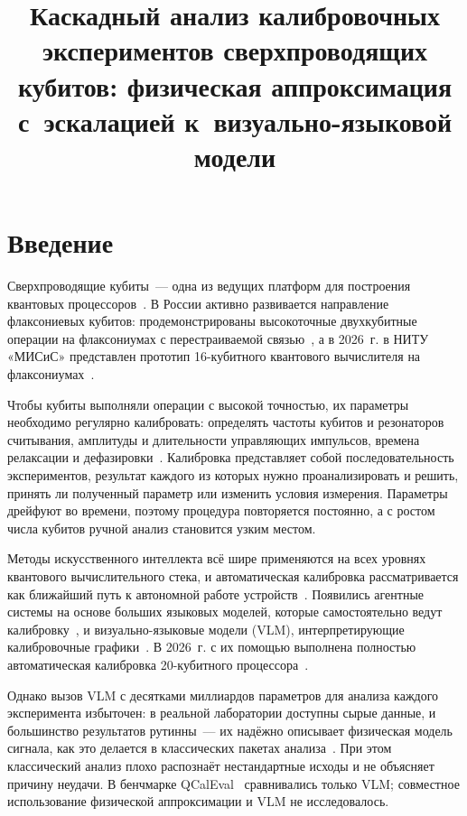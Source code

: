 \documentclass{misisarticle}
\title{Каскадный анализ калибровочных экспериментов сверхпроводящих кубитов: физическая аппроксимация с~эскалацией к~визуально-языковой модели}
\begin{document}
\maketitle

\section{Введение}

Сверхпроводящие кубиты~--- одна из ведущих платформ для построения квантовых процессоров~\cite{krantz2019}. В России активно развивается направление флаксониевых кубитов: продемонстрированы высокоточные двухкубитные операции на флаксониумах с перестраиваемой связью~\cite{moskalenko2022}, а в 2026~г. в НИТУ «МИСиС» представлен прототип 16-кубитного квантового вычислителя на флаксониумах~\cite{misis2026}.

Чтобы кубиты выполняли операции с высокой точностью, их параметры необходимо регулярно калибровать: определять частоты кубитов и резонаторов считывания, амплитуды и длительности управляющих импульсов, времена релаксации и дефазировки~\cite{krantz2019}. Калибровка представляет собой последовательность экспериментов, результат каждого из которых нужно проанализировать и решить, принять ли полученный параметр или изменить условия измерения. Параметры дрейфуют во времени, поэтому процедура повторяется постоянно, а с ростом числа кубитов ручной анализ становится узким местом.

Методы искусственного интеллекта всё шире применяются на всех уровнях квантового вычислительного стека, и автоматическая калибровка рассматривается как ближайший путь к автономной работе устройств~\cite{alexeev2025}. Появились агентные системы на основе больших языковых моделей, которые самостоятельно ведут калибровку~\cite{cao2025kagents}, и визуально-языковые модели (VLM), интерпретирующие калибровочные графики~\cite{cao2026qcaleval, nvidia2026ising}. В 2026~г. с их помощью выполнена полностью автоматическая калибровка 20-кубитного процессора~\cite{qcr2026iqm}.

Однако вызов VLM с десятками миллиардов параметров для анализа каждого эксперимента избыточен: в реальной лаборатории доступны сырые данные, и большинство результатов рутинны~--- их надёжно описывает физическая модель сигнала, как это делается в классических пакетах анализа~\cite{kanazawa2023}. При этом классический анализ плохо распознаёт нестандартные исходы и не объясняет причину неудачи. В бенчмарке QCalEval~\cite{cao2026qcaleval} сравнивались только VLM; совместное использование физической аппроксимации и VLM не исследовалось.
\end{document}
